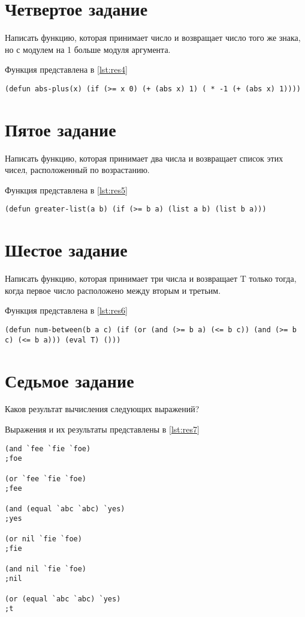 \section{ Четвертое задание}
Написать функцию, которая принимает число и возвращает число того же знака, но с модулем на 1 больше модуля аргумента.

Функция представлена в \ref{lst:res4}

\begin{lstlisting}[style=lispStyle, caption={ Представление функции.},
                    label={lst:res4}]
(defun abs-plus(x) (if (>= x 0) (+ (abs x) 1) ( * -1 (+ (abs x) 1))))
\end{lstlisting}

\section{ Пятое задание}
Написать функцию, которая принимает два числа и возвращает список этих чисел, расположенный по возрастанию.

Функция представлена в \ref{lst:res5}

\begin{lstlisting}[style=lispStyle, caption={ Представление функции.},
                    label={lst:res5}]
(defun greater-list(a b) (if (>= b a) (list a b) (list b a)))
\end{lstlisting}

\section{ Шестое задание}
Написать функцию, которая принимает три числа и возвращает T только тогда, когда первое число расположено между вторым и третьим.

Функция представлена в \ref{lst:res6}

\begin{lstlisting}[style=lispStyle, caption={ Представление функции.},
                    label={lst:res6}]
(defun num-between(b a c) (if (or (and (>= b a) (<= b c)) (and (>= b c) (<= b a))) (eval T) ()))
\end{lstlisting}

\section{ Седьмое задание}
Каков результат вычисления следующих выражений?

Выражения и их результаты представлены в \ref{lst:res7}

\begin{lstlisting}[style=lispStyle, caption={ Выражения и их результаты.},
                    label={lst:res7}]
(and `fee `fie `foe)
;foe

(or `fee `fie `foe)
;fee

(and (equal `abc `abc) `yes)
;yes

(or nil `fie `foe)
;fie

(and nil `fie `foe)
;nil

(or (equal `abc `abc) `yes)
;t
\end{lstlisting}
